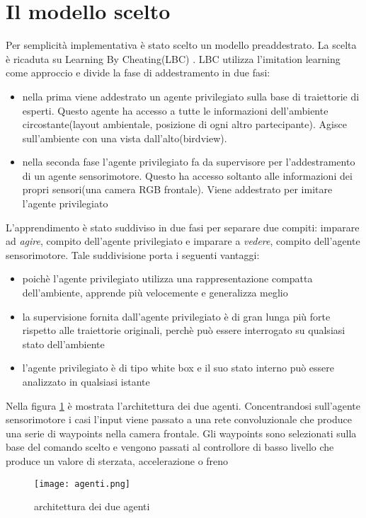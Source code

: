 \section{Il modello scelto}
Per semplicità implementativa è stato scelto un modello preaddestrato. La scelta è ricaduta su Learning By Cheating(LBC) \cite{lbc}. LBC utilizza l'imitation learning come
approccio e divide la fase di addestramento in due fasi: \begin{itemize}
    \item nella prima viene addestrato un agente privilegiato sulla base di traiettorie di esperti. Questo agente ha accesso a tutte le informazioni 
    dell'ambiente circostante(layout ambientale, posizione di ogni altro partecipante). Agisce sull'ambiente con una vista dall'alto(birdview).
    \item nella seconda fase l'agente privilegiato fa da supervisore per l'addestramento di un agente sensorimotore. Questo ha accesso soltanto alle informazioni dei
    propri sensori(una camera RGB frontale). Viene addestrato per imitare l'agente privilegiato
\end{itemize}
L'apprendimento è stato suddiviso in due fasi per separare due compiti: imparare ad \emph{agire}, compito dell'agente privilegiato e imparare a \emph{vedere}, compito dell'agente sensorimotore.
Tale suddivisione porta i seguenti vantaggi:\begin{itemize}
    \item poichè l'agente privilegiato utilizza una rappresentazione compatta dell'ambiente, apprende più velocemente e generalizza meglio
    \item la supervisione fornita dall'agente privilegiato è di gran lunga più forte rispetto alle traiettorie originali, perchè può essere interrogato 
    su qualsiasi stato dell'ambiente
    \item l'agente privilegiato è di tipo white box e il suo stato interno può essere analizzato in qualsiasi istante
\end{itemize}
Nella figura \ref{fig:arch} è mostrata l'architettura dei due agenti. Concentrandosi sull'agente sensorimotore i casi l'input viene passato a una rete convoluzionale che produce una serie di 
waypoints nella camera frontale. Gli waypoints  sono selezionati sulla base del comando scelto e vengono passati al controllore di basso livello che produce un valore di sterzata, accelerazione o freno
\begin{figure}[h!]
    \texttt{[image: agenti.png]}
    \caption{architettura dei due agenti\cite{lbc}}
    \label{fig:arch}
\end{figure}
